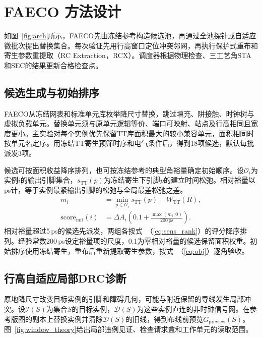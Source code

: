 \documentclass[twocolumn,10pt,fontset=windows]{ctexart}
\renewcommand{\eqref}[1]{\textup{（\ref{#1}）}}
\begin{document}
\section{FAECO 方法设计}

如图~\ref{fig:arch}所示，FAECO先由冻结参考构造候选池，再通过全池探针或自适应微批次提出替换集合。每次验证先用行高窗口定位冲突邻网，再执行保护式重布和寄生参数重提取（RC Extraction，RCX）。调度器根据物理检查、三工艺角STA和SEC的结果更新合格检查点。

\subsection{候选生成与初始排序}
\label{sec:pool}

FAECO从冻结网表和标准单元库枚举降尺寸替换，跳过填充、阱接触、时钟树与虚拟负载单元。替换单元须与原单元逻辑等价、端口可映射、站点及行高相同且宽度更小。主实验对每个实例优先保留TT库面积最大的较小兼容单元，面积相同时按单元名定序。用冻结TT寄生预筛时序和电气条件后，得到18项候选，默认每批派发3项。

候选可按面积收益降序排列，也可按冻结参考的典型角裕量确定初始顺序。设$\mathcal O_i$为实例$i$的输出引脚集合，$s_{\mathrm{TT}}(p)$为冻结寄生下引脚$p$的建立时间松弛。相对裕量以ps计，等于实例最紧输出引脚的松弛与全局最差松弛之差。
\begin{equation}
\label{eq:sens_rank}
\begin{aligned}
m_i &= \min_{p\in\mathcal O_i}s_{\mathrm{TT}}(p)-W_{\mathrm{TT}}(R),\\
\mathrm{score}_{\mathrm{init}}(i)
    &= \Delta A_i \left(0.1+\frac{\max(m_i,0)}{200\,\mathrm{ps}}\right).
\end{aligned}
\end{equation}
相对裕量超过5\,ps的候选先派发，两组各按式~\eqref{eq:sens_rank}的评分降序排列。经验常数200\,ps设定裕量项的尺度，0.1为零相对裕量的候选保留面积权重。初始排序使用冻结寄生，重布后重新提取寄生参数，按式~\eqref{eq:obj}逐角验收。

\subsection{行高自适应局部DRC诊断}
\label{sec:boxed_drc}

原地降尺寸改变目标实例的引脚和障碍几何，可能与附近保留的导线发生局部冲突。设$\mathcal I(S)$为集合$S$的目标实例，$\mathcal D(S)$为这些实例直连的非时钟信号网。在参考版图的副本上替换实例并清除$\mathcal D(S)$的旧线，得到布线前预览$G_{\mathrm{preview}}(S)$。图~\ref{fig:window_theory}给出局部违例见证、检查请求盒和工作单元的读取范围。
\end{document}
